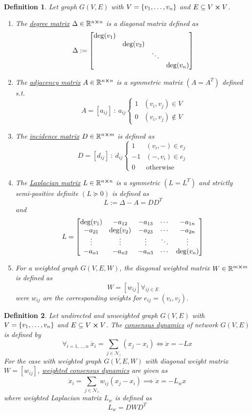 \documentclass[]{article}
\numberwithin{equation}{section}
\newcommand{\R}{\mathbb{R}}
\newcommand{\st}{\ : \ }
\newtheorem{definition}{Definition}
\begin{document}
\newpage
\begin{definition} \label{def:graph_matrices}
	Let graph $G(V,E)$ with $V = \qty{v_1,\dots,v_n}$ and $E \subseteq V \cross V$.
	\begin{enumerate}
		\item The \underline{\emph{degree matrix}} $\Delta \in \R^{n\cross n}$ is a diagonal matrix defined as \[
			\Delta := \mqty[\dmat{\deg(v_1), \deg(v_2), \ddots, \deg(v_n)}]
		\]
		\item The \emph{\underline{adjacency matrix}} $A \in \R^{n\cross n}$ is a symmetric matrix $(A = A^T)$ defined s.t. \[
			A = [a_{ij}] \st a_{ij} \begin{cases}
				1 &(v_i,v_j) \in V\\
				0 &(v_i,v_j) \notin V
			\end{cases}
		\]
		\item The \emph{\underline{incidence matrix}} $D \in \R^{n \cross m}$ is defined as\[
			D = [d_{ij}] \st d_{ij} \begin{cases}
				1 	&(v_i,-) \in e_{j}\\
				-1	&(-,v_i) \in e_{j}\\
				0	&\text{otherwise}
			\end{cases}
		\]
		\item The \emph{\underline{Laplacian matrix}} $L \in \R^{n \cross n}$ is a symmetric $(L = L^T)$ and strictly semi-positive definite $(L \succeq 0)$ is defined as\[
			L := \Delta - A = D D^T
		\]and\[
			L = \mqty[
				\deg(v_1)	&-a_{12}	&-a_{13}	&\cdots	&-a_{1n}\\
				-a_{21}		&\deg(v_2)	&-a_{23}	&\cdots	&-a_{2n}\\
				\vdots		&\vdots		&\vdots		&\ddots	&\vdots\\
				-a_{n1}		&-a_{n2}	&-a_{n3}	&\cdots	&\deg(v_n)
			]
		\]
		\item For a weighted graph $G(V,E,W)$, the diagonal weighted matrix $W\in \R^{m\cross m}$ is defined as\[
			W = [w_{ij}] \forall_{ij \in E}
		\]
		were $w_{ij}$ are the corresponding weights for $e_{ij} = (v_i,v_j)$.
	\end{enumerate}
\end{definition}

\begin{definition} \label{def:consensus_dynamics}
	Let undirected and unweighted graph $G(V,E)$ with $V = \qty{v_1,\dots,v_n}$ and $E \subseteq V \cross V$.
	The \emph{\underline{consensus dynamics}} of network $G(V,E)$ is defined by\[
		\forall_{i=1,\dots,n} \ \dot{x}_i = \sum_{j\in \mathcal{N}_i} (x_j - x_i)
		\iff \dot{x} = -L x
	\] For the case with weighted graph $G(V,E,W)$ with diagonal weight matrix $W = [w_{ij}]$, 
	\emph{\underline{weighted consensus dynamics}} are given as\[
		\dot{x}_i = \sum_{j\in\mathcal{N}_i} w_{ij} (x_j - x_i) 
		\implies \dot{x} = - L_{w} x
	\]where weighted Laplacian matrix $L_{w}$ is defined as\[
		L_{w} = D W D^T
	\]
\end{definition}
\end{document}
